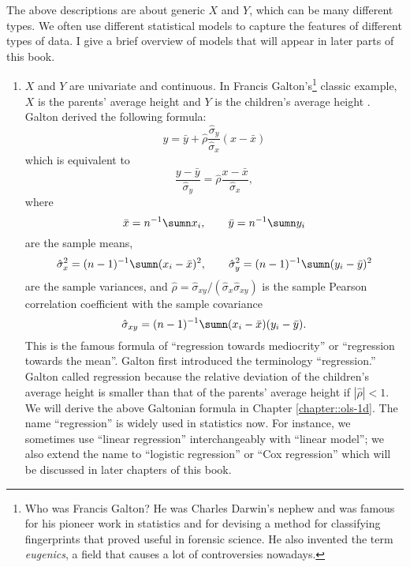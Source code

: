 The above descriptions are about generic $X$ and $Y$, which can be
many different types. We often use different statistical models to
capture the features of different types of data. I give a brief overview
of models that will appear in later parts of this book.
\begin{enumerate}[(T1)]
\item $X$ and $Y$ are univariate and continuous. In Francis Galton's\footnote{Who was Francis Galton? He was Charles Darwin's nephew and was famous
for his pioneer work in statistics and for devising a method for classifying
fingerprints that proved useful in forensic science. He also invented the term {\it eugenics}, a field that causes a lot of controversies nowadays.} classic example, $X$ is the parents' average height and $Y$ is the children's
average height \citep{galton1886regression}. Galton derived the following formula:
\[
y = \bar{y} + \hat\rho \frac{\hat{\sigma}_{y}}{\hat{\sigma}_{x}} (x-\bar{x})
\]
which is equivalent to
\begin{equation}
\label{eq::galtonian-formula-1}
\frac{y-\bar{y}}{\hat{\sigma}_{y}}
= \hat\rho \frac{x-\bar{x}}{\hat{\sigma}_{x}},
\end{equation}
where 
$$
\bar{x} = n^{-1} \sumn x_i,\qquad \bar{y} = n^{-1} \sumn y_i
$$ 
are the sample means, 
$$
\hat{\sigma}_{x}^2 = (n-1)^{-1} \sumn (x_i - \bar{x})^2,\qquad \hat{\sigma}_{y}^2 =  (n-1)^{-1} \sumn (y_i - \bar{y})^2
$$ 
are the sample variances, and $ \hat\rho =  \hat{\sigma}_{xy} / ( \hat{\sigma}_{x} \hat{\sigma}_{xy} ) $ is the
sample Pearson correlation coefficient with the sample covariance 
$$
\hat{\sigma}_{xy}  =  (n-1)^{-1} \sumn(x_{i}-\bar{x})(y_{i}-\bar{y}).
$$
%
 This is the famous formula of ``regression towards mediocrity'' or ``regression towards the mean''. Galton first introduced the terminology ``regression.'' Galton called regression because the relative deviation of the children's average height is smaller than that of the parents' average height if $ | \hat\rho  | < 1$. We will derive the above Galtonian formula in Chapter \ref{chapter::ols-1d}. 
The name ``regression'' is widely used in statistics now. For instance, we sometimes use ``linear regression'' interchangeably with ``linear model''; we also extend the name to ``logistic regression'' or ``Cox regression'' which will be discussed in later chapters of this book. 
 
 
 

\end{enumerate}
